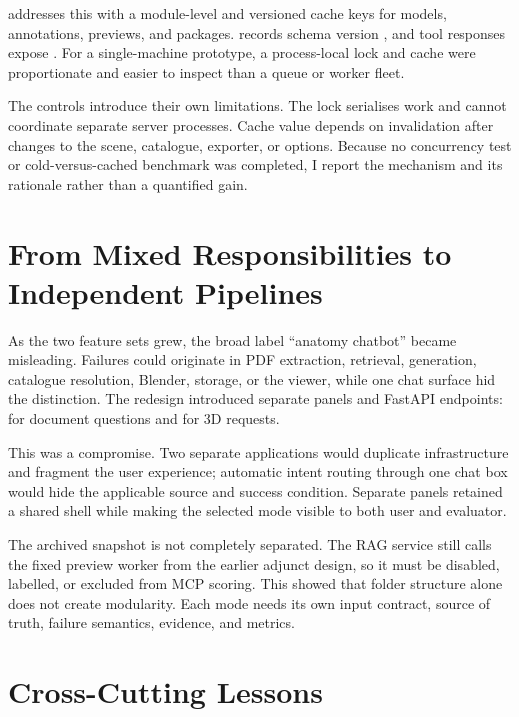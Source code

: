  addresses this with a module-level  and versioned cache keys for models, annotations, previews, and packages.  records schema version , and tool responses expose . For a single-machine prototype, a process-local lock and cache were proportionate and easier to inspect than a queue or worker fleet.

The controls introduce their own limitations. The lock serialises work and cannot coordinate separate server processes. Cache value depends on invalidation after changes to the scene, catalogue, exporter, or options. Because no concurrency test or cold-versus-cached benchmark was completed, I report the mechanism and its rationale rather than a quantified gain.

\section{From Mixed Responsibilities to Independent Pipelines}
\label{sec:evolution-dual-pipeline}

As the two feature sets grew, the broad label ``anatomy chatbot'' became misleading. Failures could originate in PDF extraction, retrieval, generation, catalogue resolution, Blender, storage, or the viewer, while one chat surface hid the distinction. The redesign introduced separate panels and FastAPI endpoints:  for document questions and  for 3D requests.

This was a compromise. Two separate applications would duplicate infrastructure and fragment the user experience; automatic intent routing through one chat box would hide the applicable source and success condition. Separate panels retained a shared shell while making the selected mode visible to both user and evaluator.

The archived snapshot is not completely separated. The RAG service still calls the fixed preview worker from the earlier adjunct design, so it must be disabled, labelled, or excluded from MCP scoring. This showed that folder structure alone does not create modularity. Each mode needs its own input contract, source of truth, failure semantics, evidence, and metrics.

\section{Cross-Cutting Lessons}
\label{sec:evolution-cross-cutting-lessons}

